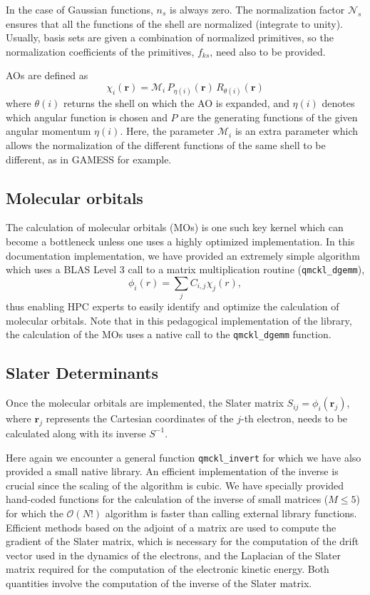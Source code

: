 In the case of Gaussian functions, $n_s$ is always zero.  The
normalization factor $\mathcal{N}_s$ ensures that all the functions of
the shell are normalized (integrate to unity). Usually, basis sets are
given a combination of normalized primitives, so the normalization
coefficients of the primitives, $f_{ks}$, need also to be provided.

\acp{AO} are defined as
\[
\chi_i (\mathbf{r}) = \mathcal{M}_i\, P_{\eta(i)}(\mathbf{r})\, R_{\theta(i)} (\mathbf{r})
\] 
where $\theta(i)$ returns the shell on which the \ac{AO} is expanded, and
$\eta(i)$ denotes which angular function is chosen and $P$ are the
generating functions of the given angular momentum $\eta(i)$.  Here,
the parameter $\mathcal{M}_i$ is an extra parameter which allows the
normalization of the different functions of the same shell to be
different, as in GAMESS for example.


\subsection{Molecular orbitals}

The calculation of molecular orbitals (MOs) is one such key kernel which can
become a bottleneck unless one uses a highly optimized implementation.
In this documentation implementation, we have provided an extremely simple
algorithm which uses a \ac{BLAS} Level 3 call to a matrix multiplication
routine (\texttt{qmckl_dgemm}),
\[
  \phi_i(r) = \sum_{j}C_{i,j}\chi_j(r),
    \label{eq:mos}
\]
thus enabling \ac{HPC} experts to easily identify and optimize the calculation
of molecular orbitals. Note that in this pedagogical implementation of the
library, the calculation of the \acp{MO} uses a native call to the
\texttt{qmckl_dgemm} function.

\subsection{Slater Determinants}

Once the molecular orbitals are implemented, the Slater matrix $S_{ij} = \phi_i(\mathbf{r}_j)$,
where $\mathbf{r}_j$ represents the Cartesian coordinates of the $j$-th electron, needs to be
calculated along with its inverse $S^{-1}$.
  
Here again we encounter a general  function
\texttt{qmckl_invert} for which we have also provided a small native
library. An efficient implementation of the inverse is crucial since the 
scaling of the algorithm is cubic. We have specially provided hand-coded functions for
the calculation of the inverse of small matrices ($M\le 5$) for which the
$\mathcal{O}(N!)$ algorithm is faster than calling external library functions.
Efficient methods based on the adjoint of a matrix \cite{MCMQC} are used to
compute the gradient of the Slater matrix, which is necessary for the 
computation of the drift vector used in the dynamics of the
electrons, and the Laplacian of the Slater matrix required for the computation of
the electronic kinetic energy. Both quantities involve the computation of
the inverse of the Slater matrix.

